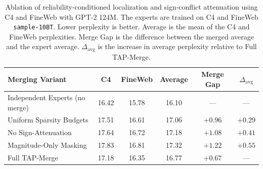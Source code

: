 \begin{table}[t]
\centering
\small
\caption{Ablation of reliability-conditioned localization and sign-conflict attenuation using C4 and FineWeb with GPT-2 124M. The experts are trained on C4 and FineWeb \texttt{sample-10BT}. Lower perplexity is better. Average is the mean of the C4 and FineWeb perplexities. Merge Gap is the difference between the merged average and the expert average. $\Delta_{\mathrm{avg}}$ is the increase in average perplexity relative to Full TAP-Merge.}
\label{tab:ablation_reliability_localization}
\begin{tabular}{lccccc}
\toprule
\textbf{Merging Variant}
& \textbf{C4}
& \textbf{FineWeb}
& \textbf{Average}
& \textbf{Merge Gap}
& $\Delta_{\mathrm{avg}}$ \\
\midrule
Independent Experts (no merge)
& 16.42 & 15.78 & 16.10 & --- & --- \\
\midrule
Uniform Sparsity Budgets
& 17.51 & 16.61 & 17.06 & $+0.96$ & $+0.29$ \\
No Sign-Attenuation
& 17.64 & 16.72 & 17.18 & $+1.08$ & $+0.41$ \\
Magnitude-Only Masking
& 17.83 & 16.81 & 17.32 & $+1.22$ & $+0.55$ \\
\midrule
Full TAP-Merge
& 17.18 & 16.35 & 16.77 & $+0.67$ & --- \\
\bottomrule
\end{tabular}
\end{table}
